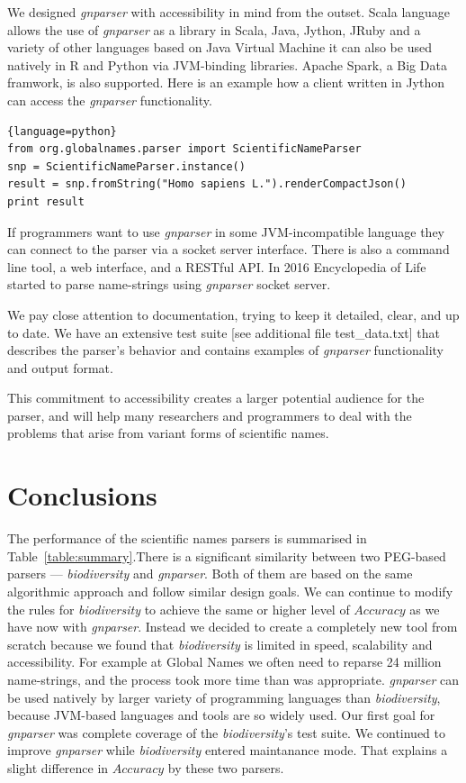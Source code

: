 \documentclass{bmcart}
\begin{document}
We designed \textit{gnparser} with accessibility in mind from the outset. Scala language allows the use of \textit{gnparser} as a library in Scala, Java, Jython, JRuby and a variety of other languages based on Java Virtual Machine it can also be used natively in R and Python via JVM-binding libraries. Apache Spark, a Big Data framwork, is also supported.  Here is an example how a client written in Jython can access the \textit{gnparser} functionality.

\begin{lstlisting}{language=python}
from org.globalnames.parser import ScientificNameParser
snp = ScientificNameParser.instance()
result = snp.fromString("Homo sapiens L.").renderCompactJson()
print result
\end{lstlisting}


If programmers want to use \textit{gnparser} in some JVM-incompatible language they can connect to the parser via a socket server interface. There is also a command line tool, a web interface, and a RESTful API\@. In 2016 Encyclopedia of Life started to parse name-strings using \textit{gnparser} socket server.


We pay close attention to documentation, trying to keep it detailed, clear, and up to date. We have an extensive test suite [see additional file test\_data.txt] that describes the parser's behavior and contains examples of \textit{gnparser} functionality and output format.

This commitment to accessibility creates a larger potential audience for the parser, and will help many researchers and programmers to deal with the problems that arise from variant forms of scientific names.

\section*{Conclusions}

The performance of the scientific names parsers is summarised  in Table~\ref{table:summary}.There is a significant similarity between two PEG-based parsers --- \textit{biodiversity} and \textit{gnparser}. Both of them are based on the same algorithmic approach and follow similar design goals. We can continue to modify the rules for \textit{biodiversity} to achieve the same or higher level of $Accuracy$ as we have now with \textit{gnparser}. Instead we decided to create a completely new tool from scratch because we found that \textit{biodiversity} is limited in speed, scalability and accessibility. For example at Global Names we often need to reparse 24 million name-strings, and the process took more time than was appropriate.  \textit{gnparser} can be used natively by larger variety of programming languages than \textit{biodiversity}, because JVM-based languages and tools are so widely used. Our first goal for \textit{gnparser} was complete coverage of the \textit{biodiversity}'s test suite. We continued to improve \textit{gnparser} while \textit{biodiversity} entered maintanance mode. That explains a slight difference in $Accuracy$ by these two parsers.
\end{document}

